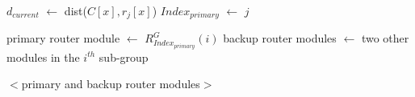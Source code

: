 \begin{algorithm}
\begin{algorithmic}[1]
    \State $d_{current}$ $\leftarrow$ dist($C[x], r_j[x]$) 
        \State $Index_{primary}$ $\leftarrow$ $j$
        \EndIf

\EndFor

    \State primary router module $\leftarrow$ $R^G_{Index_{primary}}(i)$
    \State backup router modules $\leftarrow$ 
     two other modules in the $i^{th}$ sub-group

    \Return $<$primary and backup router modules$>$ \\ 

\label{second:end}

\EndProcedure
\\
\end{algorithmic}
\end{algorithm}

\begin{comment}
With router placement in place, we now face the question that, how does each
client select which router to minimize communication hops as well as to avoid
congestion. This section provides an overview on route selection process and
algorithms. Routers are divided into 9 groups, with each group containing 12
router modules. We denote a router group with a superscript, and a router
module in that group with a subscript. For example, the first module in a
router group $A$ is denoted as $R^A_1$ so on and so forth. The following
algorithm describe the core idea of selection process. The input is a given
router group and client ID, the output is a triple: primary router and two back
up routers.
\end{comment}




